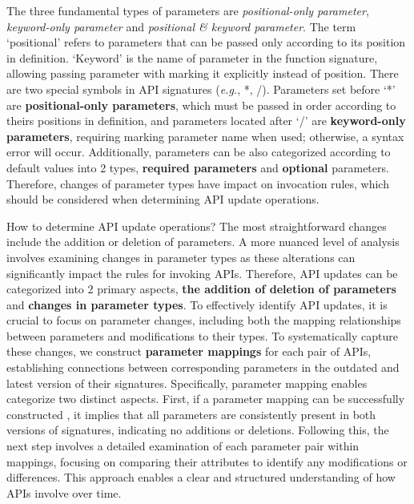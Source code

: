 The three fundamental types of parameters are \textit{positional-only parameter}, \textit{keyword-only parameter} and \textit{positional \& keyword parameter}. The term `positional' refers to parameters that can be passed only according to its position in definition. `Keyword' is the name of parameter in the function signature, allowing passing parameter with marking it explicitly instead of position. There are two special symbols in API signatures (\emph{e.g.}, *, /). Parameters set before `*' are \textbf{positional-only parameters}, which must be passed in order according to theirs positions in definition, and parameters located after `/' are \textbf{keyword-only parameters}, requiring marking parameter name when used; otherwise, a syntax error will occur. Additionally, parameters can be also categorized according to default values into 2 types, \textbf{required parameters} and \textbf{optional} parameters. Therefore, changes of parameter types have impact on invocation rules, which should be considered when determining API update operations.

How to determine API update operations? 
The most straightforward changes include the addition or deletion of parameters. 
A more nuanced level of analysis involves examining changes in parameter types as these alterations can significantly impact the rules for invoking APIs. 
Therefore,  API updates can be categorized into 2 primary aspects, \textbf{the addition of deletion of parameters} and \textbf{changes in parameter types}. 
To effectively identify API updates, it is crucial to focus on parameter changes, including both the mapping relationships between parameters and modifications to their types. 
To systematically capture these changes, we construct \textbf{parameter mappings} for each pair of APIs, establishing connections between corresponding parameters in the outdated and latest version of their signatures. 
Specifically, parameter mapping enables categorize two distinct aspects. 
First, if a parameter mapping can be successfully constructed , it implies that all parameters are consistently present in both versions of signatures, indicating no additions or deletions. 
Following this, the next step involves a detailed examination of each parameter pair within mappings, focusing on comparing their attributes to identify any modifications or differences. 
This approach enables a clear and structured understanding of how APIs involve over time. 

